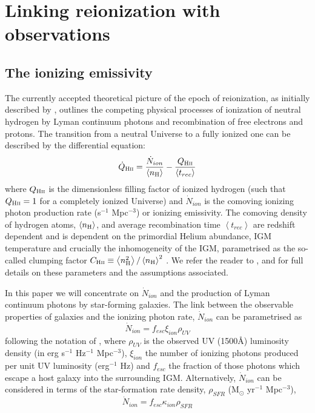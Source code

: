 \section{Linking reionization with observations}\label{sec:link}
\subsection{The ionizing emissivity}
The currently accepted theoretical picture of the epoch of reionization, as initially described by \citet{Madau:1999kl}, outlines the competing physical processes of ionization of neutral hydrogen by Lyman continuum photons and recombination of free electrons and protons. The transition from a neutral Universe to a fully ionized one can be described by the differential equation:
\begin{equation}
\dot{Q}_\textsc{Hii} = \frac{\dot{N}_{ion}}{\left \langle n_{\textsc{H}} \right \rangle} - \frac{{Q}_\textsc{Hii}}{\left \langle t_{rec} \right \rangle}
\end{equation}
\noindent where ${Q}_\textsc{Hii}$ is the dimensionless filling factor of ionized hydrogen (such that ${Q}_\textsc{Hii} = 1$ for a completely ionized Universe) and $\dot{N}_{ion}$ is the comoving ionizing photon production rate (s$^{-1}$ Mpc$^{-3}$) or ionizing emissivity. The comoving density of hydrogen atoms, $\left \langle n_{\textsc{H}} \right \rangle$, and average recombination time $\left \langle t_{rec} \right \rangle$ are redshift dependent and is dependent on the primordial Helium abundance, IGM temperature and crucially the inhomogeneity of the IGM, parametrised as the so-called clumping factor $C_{\textsc{Hii}} \equiv \left \langle n^{2}_{\textsc{H}} \right \rangle / \left \langle n_{\textsc{H}} \right \rangle^{2}$ \citep{Pawlik:2009id}. We refer the reader to \citet{Madau:1999kl}, \citet{Kuhlen:2012ka} and \citet{2010Natur.468...49R,Robertson:2013ji} for full details on these parameters and the assumptions associated. 

In this paper we will concentrate on $\dot{N}_{ion}$ and the production of Lyman continuum photons by star-forming galaxies. The link between the observable properties of galaxies and the ionizing photon rate, $\dot{N}_{ion}$ can be parametrised as
\begin{equation}\label{eq:Nion_UV}
\dot{N}_{ion} = f_{esc}\xi_{ion}\rho_{UV}
\end{equation}
\noindent following the notation of \cite{Robertson:2013ji}, where $\rho_{UV}$ is the observed UV (1500\AA) luminosity density (in erg s$^{-1}$ Hz$^{-1}$ Mpc$^{-3}$), $\xi_{ion}$ the number of ionizing photons produced per unit UV luminosity (erg$^{-1}$ Hz) and $f_{esc}$ the fraction of those photons which escape a host galaxy into the surrounding IGM. Alternatively, $\dot{N}_{ion}$ can be considered in terms of the star-formation rate density, $\rho_{SFR}$ (M$_{\odot}$ yr$^{-1}$ Mpc$^{-3}$),
\begin{equation}\label{eq:Nion_SFR}
    \dot{N}_{ion} = f_{esc} \kappa_{ion} \rho_{SFR}
\end{equation}

